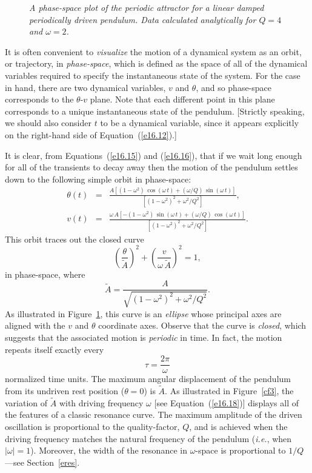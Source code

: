 \begin{figure}
\epsfysize=2.5in
\centerline{}
\caption{\em A phase-space plot of the periodic attractor for a linear  damped periodically
driven  pendulum. Data calculated analytically for $Q=4$ and $\omega=2$. }\label{cf2}
\end{figure}

It is often convenient to {\em visualize}\/ the motion of a dynamical system as an orbit, or  trajectory, in
{\em phase-space}, which is defined as the space of all of the dynamical variables required to
specify the instantaneous state of the system. For the case in hand, there are two dynamical
variables, $v$ and $\theta$, and so phase-space corresponds to the $\theta$-$v$ plane. Note that
each different point in this plane corresponds to a unique instantaneous state of the pendulum.
[Strictly speaking, we should also consider $t$ to be a dynamical variable, since it 
appears explicitly on the right-hand side of Equation~(\ref{e16.12}).]

It is clear, from Equations~(\ref{e16.15}) and (\ref{e16.16}), that if we wait long enough for all
of the transients to decay away then the motion of the pendulum settles down to the
following simple orbit in phase-space:
\begin{eqnarray}
\theta(t) &=&
\frac{A\left[(1-\omega^2)\,\cos(\omega\, t)+ (\omega/Q)\,\sin(\omega\, t)\right]}
{\left[(1-\omega^2)^2+\omega^2/Q^2\right]},\\[0.5ex]
v(t) &=& \frac{\omega\, A\left[-(1-\omega^2)\,\sin(\omega\, t)+ (\omega/Q)\,\cos(\omega\, t)\right]}
{\left[(1-\omega^2)^2+\omega^2/Q^2\right]}.
\end{eqnarray}
This orbit traces out the closed curve
\begin{equation}
\left(\frac{\theta}{\tilde{A}}\right)^2 + \left(\frac{v}{\omega\,\tilde{A}}\right)^2 =1,
\end{equation}
in phase-space, where 
\begin{equation}\label{e16.18}
\tilde{A} = \frac{A}{\sqrt{(1-\omega^2)^2+\omega^2/Q^2}}.
\end{equation}
As illustrated in Figure~\ref{cf2}, this curve is an {\em ellipse}\/ whose principal axes are 
aligned with the $v$ and $\theta$ coordinate axes.
Observe that the curve is {\em closed}, which suggests that the associated motion is {\em periodic}\/ in time. In fact, the
motion repeats itself exactly every
\begin{equation}
\tau = \frac{2\pi}{\omega}
\end{equation}
normalized time units. The maximum angular displacement of the pendulum from its undriven rest position
($\theta=0$) is $\tilde{A}$. 
As illustrated in Figure~\ref{cf3}, the variation of $\tilde{A}$ with driving frequency $\omega$
[see Equation~(\ref{e16.18})] displays all of the features of a classic resonance curve. The maximum
amplitude of the driven oscillation is proportional to the quality-factor, $Q$, and
is achieved when the driving frequency matches the natural
frequency of the pendulum ({\em i.e.}, when $|\omega|=1$). Moreover, 
the width of the resonance in $\omega$-space
is proportional to $1/Q$---see Section~\ref{eres}.

